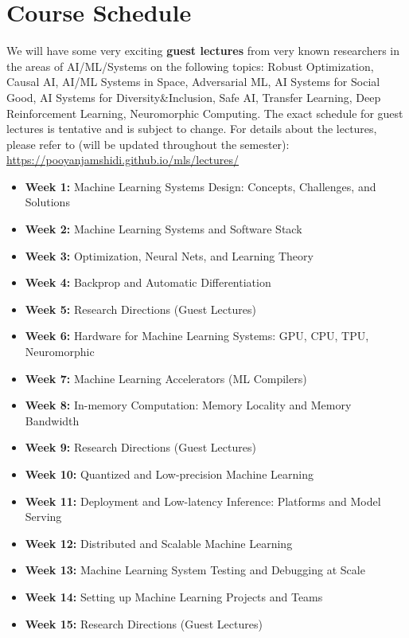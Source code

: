 \documentclass[11pt]{article}
\begin{document}
\newpage

\section*{Course Schedule}
We will have some very exciting \textbf{guest lectures} from very known researchers in the areas of AI/ML/Systems on the following topics: Robust Optimization, Causal AI, AI/ML Systems in Space, Adversarial ML, AI Systems for Social Good, AI Systems for Diversity\&Inclusion, Safe AI, Transfer Learning, Deep Reinforcement Learning, Neuromorphic Computing. The exact schedule for guest lectures is tentative and is subject to change. For details about the lectures, please refer to (will be updated throughout the semester): \url{https://pooyanjamshidi.github.io/mls/lectures/}


\begin{itemize}
\item \textbf{Week 1:} Machine Learning Systems Design: Concepts, Challenges, and Solutions
\item \textbf{Week 2:} Machine Learning Systems and Software Stack
\item \textbf{Week 3:} Optimization, Neural Nets, and Learning Theory
\item \textbf{Week 4:} Backprop and Automatic Differentiation
\item \textbf{Week 5:} Research Directions (Guest Lectures)
\item \textbf{Week 6:} Hardware for Machine Learning Systems: GPU, CPU, TPU, Neuromorphic
\item \textbf{Week 7:} Machine Learning Accelerators (ML Compilers)
\item \textbf{Week 8:} In-memory Computation: Memory Locality and Memory Bandwidth
\item \textbf{Week 9:} Research Directions (Guest Lectures)
\item \textbf{Week 10:} Quantized and Low-precision Machine Learning
\item \textbf{Week 11:} Deployment and Low-latency Inference: Platforms and Model Serving
\item \textbf{Week 12:} Distributed and Scalable Machine Learning
\item \textbf{Week 13:} Machine Learning System Testing and Debugging at Scale
\item \textbf{Week 14:} Setting up Machine Learning Projects and Teams 
\item \textbf{Week 15:} Research Directions (Guest Lectures)
\end{itemize}
\end{document}
